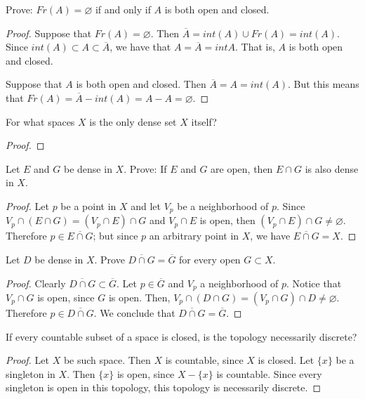 \documentclass[12pt]{article}
\begin{document}
\begin{problem}{8}
    Prove: $Fr(A) = \varnothing$ if and only if $A$ is both open and closed.
\end{problem}
\begin{proof}
Suppose that $Fr(A) = \varnothing.$ Then $\overline{A} = int(A) \cup Fr(A) = int(A)$. Since $int(A) \subset A \subset \overline{A}$, we have that $A = \overline{A} = int A.$ That is, $A$ is both open and closed.

Suppose that $A$ is both open and closed. Then $\overline{A} = A = int(A).$ But this means that $Fr(A) = \overline{A} - int(A) = A - A = \varnothing.$
\end{proof}

\begin{problem}{11}
        For what spaces $X$ is the only dense set $X$ itself?
\end{problem}
\begin{proof}
    
\end{proof}

\begin{problem}{12} Let $E$ and $G$ be dense in $X$. Prove: If $E$ and $G$ are open, then $E \cap G$ is also dense in $X.$
\end{problem}
\begin{proof}
    Let $p$ be a point in $X$ and let $V_p$ be a neighborhood of $p.$ Since $V_p \cap (E \cap G) = (V_p \cap E) \cap G$ and $V_p \cap E$ is open, then $(V_p \cap E) \cap G \neq \varnothing.$ Therefore $p \in \overline{E \cap G}$; but since $p$ an arbitrary point in $X$, we have $\overline{E \cap G} = X.$
\end{proof}
\begin{problem}{13} Let $D$ be dense in $X$. Prove $\overline{D \cap G} = \overline{G}$ for every open $G \subset X.$
\end{problem}
\begin{proof}
    Clearly $\overline{D \cap G} \subset \overline{G}$. Let $p \in \overline{G}$ and $V_p$ a neighborhood of $p.$ Notice that $V_p \cap G$ is open, since $G$ is open. Then, $V_p \cap (D \cap G) = (V_p \cap G) \cap D \neq \varnothing$. Therefore $p \in \overline{D \cap G}$. We conclude that $\overline{D \cap G} = \overline{G}$.
\end{proof}

\begin{problem}{19} If every countable subset of a space is closed, is the topology necessarily discrete?
\end{problem}
\begin{proof}
Let $X$ be such space. Then $X$ is countable, since $X$ is closed. Let $\{x\}$ be a singleton in $X$. Then $\{x\}$ is open, since $X - \{x\}$ is countable. Since every singleton is open in this topology, this topology is necessarily discrete.
\end{proof}
\end{document}
